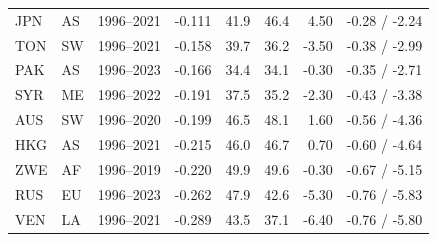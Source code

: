 \begin{tabular}{llrrrrrr}
JPN & AS & 1996--2021 & -0.111 & 41.9 & 46.4 & 4.50 & -0.28 / -2.24 \\
TON & SW & 1996--2021 & -0.158 & 39.7 & 36.2 & -3.50 & -0.38 / -2.99 \\
PAK & AS & 1996--2023 & -0.166 & 34.4 & 34.1 & -0.30 & -0.35 / -2.71 \\
SYR & ME & 1996--2022 & -0.191 & 37.5 & 35.2 & -2.30 & -0.43 / -3.38 \\
AUS & SW & 1996--2020 & -0.199 & 46.5 & 48.1 & 1.60 & -0.56 / -4.36 \\
HKG & AS & 1996--2021 & -0.215 & 46.0 & 46.7 & 0.70 & -0.60 / -4.64 \\
ZWE & AF & 1996--2019 & -0.220 & 49.9 & 49.6 & -0.30 & -0.67 / -5.15 \\
RUS & EU & 1996--2023 & -0.262 & 47.9 & 42.6 & -5.30 & -0.76 / -5.83 \\
VEN & LA & 1996--2021 & -0.289 & 43.5 & 37.1 & -6.40 & -0.76 / -5.80 \\
\bottomrule
\end{tabular}
